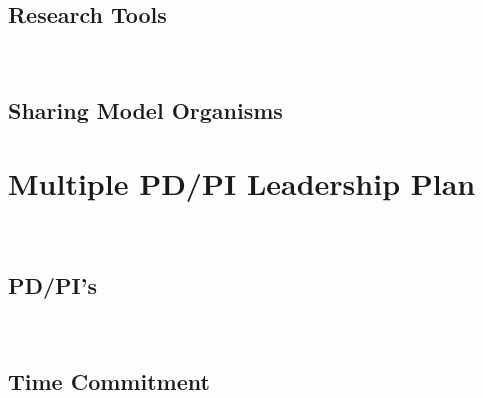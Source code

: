 ~

\subsection*{Research Tools}

\lipsum[2]

~

\subsection*{Sharing Model Organisms}

\lipsum[2]

\newpage

\section*{Multiple PD/PI Leadership Plan}

~

\subsection*{PD/PI's }

\lipsum[66]

~

\subsection*{Time Commitment}

\lipsum[66]

~

